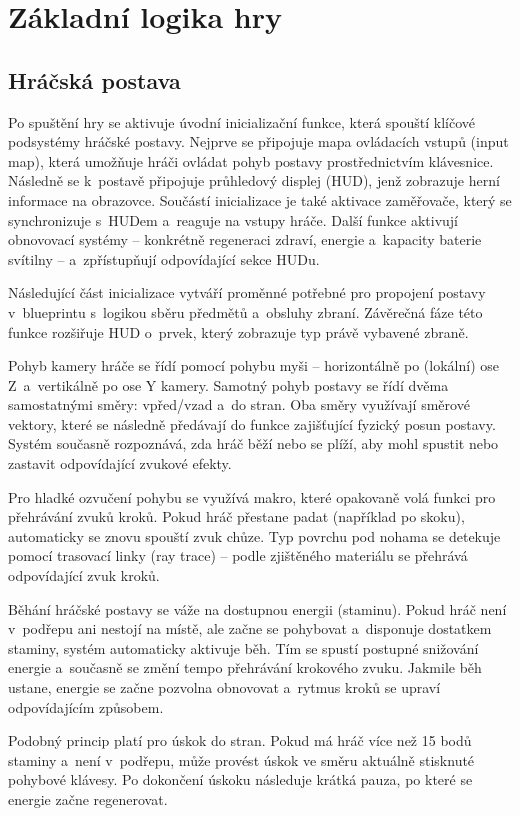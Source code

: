 \section{Základní logika hry}
\subsection{Hráčská postava}
Po spuštění hry se aktivuje úvodní inicializační funkce, která spouští klíčové podsystémy hráčské postavy. Nejprve se připojuje mapa ovládacích vstupů (input map), která umožňuje hráči ovládat pohyb postavy prostřednictvím klávesnice. Následně se k~postavě připojuje průhledový displej (HUD), jenž zobrazuje herní informace na obrazovce. Součástí inicializace je také aktivace zaměřovače, který se synchronizuje s~HUDem a~reaguje na vstupy hráče. Další funkce aktivují obnovovací systémy – konkrétně regeneraci zdraví, energie a~kapacity baterie svítilny – a~zpřístupňují odpovídající sekce HUDu.

Následující část inicializace vytváří proměnné potřebné pro propojení postavy v~blueprintu s~logikou sběru předmětů a~obsluhy zbraní. Závěrečná fáze této funkce rozšiřuje HUD o~prvek, který zobrazuje typ právě vybavené zbraně.

Pohyb kamery hráče se řídí pomocí pohybu myši – horizontálně po (lokální) ose Z~a~vertikálně po ose Y kamery. Samotný pohyb postavy se řídí dvěma samostatnými směry: vpřed/vzad a~do stran. Oba směry využívají směrové vektory, které se následně předávají do funkce zajišťující fyzický posun postavy. Systém současně rozpoznává, zda hráč běží nebo se plíží, aby mohl spustit nebo zastavit odpovídající zvukové efekty.

Pro hladké ozvučení pohybu se využívá makro, které opakovaně volá funkci pro přehrávání zvuků kroků. Pokud hráč přestane padat (například po skoku), automaticky se znovu spouští zvuk chůze. Typ povrchu pod nohama se detekuje pomocí trasovací linky (ray trace) – podle zjištěného materiálu se přehrává odpovídající zvuk kroků.

\newpage

Běhání hráčské postavy se váže na dostupnou energii (staminu). Pokud hráč není v~podřepu ani nestojí na místě, ale začne se pohybovat a~disponuje dostatkem staminy, systém automaticky aktivuje běh. Tím se spustí postupné snižování energie a~současně se změní tempo přehrávání krokového zvuku. Jakmile běh ustane, energie se začne pozvolna obnovovat a~rytmus kroků se upraví odpovídajícím způsobem.

Podobný princip platí pro úskok do stran. Pokud má hráč více než 15 bodů staminy a~není v~podřepu, může provést úskok ve směru aktuálně stisknuté pohybové klávesy. Po dokončení úskoku následuje krátká pauza, po které se energie začne regenerovat.

